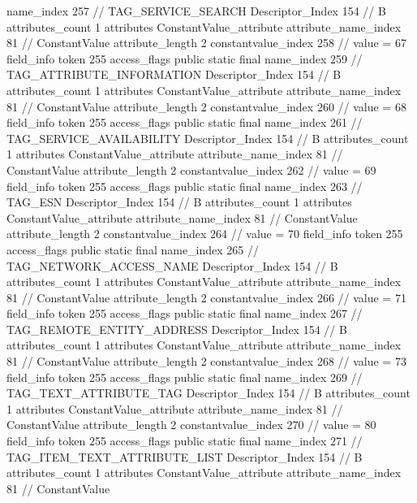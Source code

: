 {{{{{				name_index	257		// TAG_SERVICE_SEARCH
				Descriptor_Index	154		// B
				attributes_count	1
				attributes {
				ConstantValue_attribute {
					attribute_name_index	81		// ConstantValue
					attribute_length	2
					constantvalue_index	258		// value = 67
				}
				}
			}
			field_info {
				token	255
				access_flags	public static final
				name_index	259		// TAG_ATTRIBUTE_INFORMATION
				Descriptor_Index	154		// B
				attributes_count	1
				attributes {
				ConstantValue_attribute {
					attribute_name_index	81		// ConstantValue
					attribute_length	2
					constantvalue_index	260		// value = 68
				}
				}
			}
			field_info {
				token	255
				access_flags	public static final
				name_index	261		// TAG_SERVICE_AVAILABILITY
				Descriptor_Index	154		// B
				attributes_count	1
				attributes {
				ConstantValue_attribute {
					attribute_name_index	81		// ConstantValue
					attribute_length	2
					constantvalue_index	262		// value = 69
				}
				}
			}
			field_info {
				token	255
				access_flags	public static final
				name_index	263		// TAG_ESN
				Descriptor_Index	154		// B
				attributes_count	1
				attributes {
				ConstantValue_attribute {
					attribute_name_index	81		// ConstantValue
					attribute_length	2
					constantvalue_index	264		// value = 70
				}
				}
			}
			field_info {
				token	255
				access_flags	public static final
				name_index	265		// TAG_NETWORK_ACCESS_NAME
				Descriptor_Index	154		// B
				attributes_count	1
				attributes {
				ConstantValue_attribute {
					attribute_name_index	81		// ConstantValue
					attribute_length	2
					constantvalue_index	266		// value = 71
				}
				}
			}
			field_info {
				token	255
				access_flags	public static final
				name_index	267		// TAG_REMOTE_ENTITY_ADDRESS
				Descriptor_Index	154		// B
				attributes_count	1
				attributes {
				ConstantValue_attribute {
					attribute_name_index	81		// ConstantValue
					attribute_length	2
					constantvalue_index	268		// value = 73
				}
				}
			}
			field_info {
				token	255
				access_flags	public static final
				name_index	269		// TAG_TEXT_ATTRIBUTE_TAG
				Descriptor_Index	154		// B
				attributes_count	1
				attributes {
				ConstantValue_attribute {
					attribute_name_index	81		// ConstantValue
					attribute_length	2
					constantvalue_index	270		// value = 80
				}
				}
			}
			field_info {
				token	255
				access_flags	public static final
				name_index	271		// TAG_ITEM_TEXT_ATTRIBUTE_LIST
				Descriptor_Index	154		// B
				attributes_count	1
				attributes {
				ConstantValue_attribute {
					attribute_name_index	81		// ConstantValue
}}}}}}}

